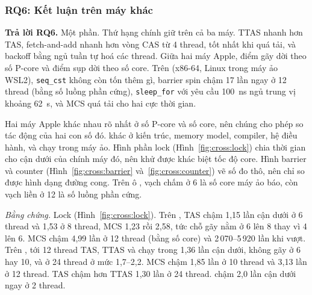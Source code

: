 \subsubsection{RQ6: Kết luận trên máy khác}

\begin{rqanswer}\textbf{Trả lời RQ6.} Một phần. Thứ hạng chính giữ trên cả ba máy. TTAS nhanh hơn TAS,
fetch-and-add nhanh hơn vòng CAS từ 4 thread,  tốt nhất khi quá tải, và backoff bằng
ngủ tuần tự hoá các thread. Giữa hai máy Apple, điểm gãy dời theo số P-core và điểm sụp dời theo số core.
Trên  (x86-64, Linux trong máy ảo WSL2), \texttt{seq\_cst} không còn tốn thêm gì, barrier
spin chậm 17 lần ngay ở 12 thread (bằng số luồng phần cứng), \texttt{sleep\_for} với yêu cầu 100~ns ngủ trung
vị khoảng 62~\textmu s, và MCS quá tải cho hai cực thời gian.\end{rqanswer}

Hai máy Apple khác nhau rõ nhất ở số P-core và số core, nên chúng cho phép so tác động của hai con số đó.
 khác  ở kiến trúc, memory model, compiler, hệ điều hành, và chạy trong
máy ảo. Hình phần lock (Hình~\ref{fig:cross:lock}) chia thời gian cho cận dưới của chính máy đó, nên khử
được khác biệt tốc độ core. Hình barrier và counter (Hình~\ref{fig:cross:barrier}
và~\ref{fig:cross:counter}) vẽ số đo thô, nên chỉ so được hình dạng đường cong. Trên ô ,
vạch chấm ở 6 là số core máy ảo báo, còn vạch liền ở 12 là số luồng phần cứng.


\emph{Bằng chứng.} Lock (Hình~\ref{fig:cross:lock}). Trên , TAS chậm 1,15 lần cận dưới
ở 6 thread và 1,53 ở 8 thread, MCS 1,23 rồi 2,58, tức chỗ gãy nằm ở 6 lên 8 thay vì 4 lên 6. MCS chậm
4,99 lần ở 12 thread (bằng số core) và 2\,070--5\,920 lần khi vượt. Trên , tới 12 thread
TAS, TTAS và  chạy trong 1,36 lần cận dưới, không gãy ở 6 hay 10, và ở 24 thread ở mức
1,7--2,2. MCS chậm 1,85 lần ở 10 thread và 3,13 lần ở 12 thread. TAS chậm hơn TTAS 1,30 lần ở 24 thread.
 chậm 2,0 lần cận dưới ngay ở 2 thread.

